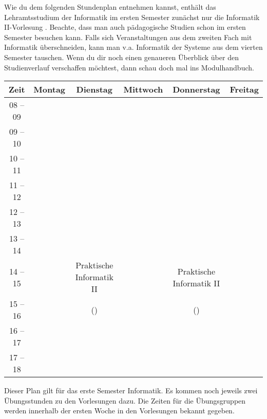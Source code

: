 Wie du dem folgenden Stundenplan entnehmen kannst, enthält das Lehramtsstudium der Informatik im ersten Semester zunächst nur die Informatik II-Vorlesung . %
Beachte, dass man auch pädagogische Studien schon im ersten Semester besuchen kann. Falls sich Veranstaltungen aus dem zweiten
Fach mit Informatik überschneiden, kann man v.a. Informatik der Systeme aus dem vierten Semester tauschen.
Wenn du dir noch einen genaueren Überblick über den Studienverlauf verschaffen möchtest, dann schau doch mal ins Modulhandbuch.

\begin{center}
	\begin{tabular}{|c|c|c|c|c|c|} \hline
		Zeit      & 	Montag 		& Dienstag			& Mittwoch 			& Donnerstag 		& Freitag	 \\\hline\hline
		08 -- 09  &					& 					&					& 					&			\\\hline
		09 -- 10  & 				& 					& 					& 					&			\\\hline
		10 -- 11  &					& 					&					& 					&			\\\hline
		11 -- 12  & 				&  					&					&			 		& 			\\\hline
		12 -- 13  & 				& 				 	& 				    & 					& 			 \\\hline
		13 -- 14  & 				& 					& 					& 					& 			 \\\hline
		14 -- 15  & 				& Praktische Informatik II 	& 			& Praktische Informatik II 	& 				\\\cline{1-2}\cline{4-4}\cline{6-6}
		15 -- 16  &					& (\Infoprof) 		& 					& (\Infoprof) 		& 				\\\hline
		16 -- 17  & 				& 					& 					& 					&\\\hline
		17 -- 18  & 				& 					& 					& 					& \\
		\hline
	\end{tabular}


\end{center}

Dieser Plan gilt für das erste Semester Informatik. Es kommen noch jeweils zwei Übungsstunden zu den Vorlesungen dazu.
Die Zeiten für die Übungsgruppen werden innerhalb der ersten Woche in den Vorlesungen bekannt gegeben.\\

